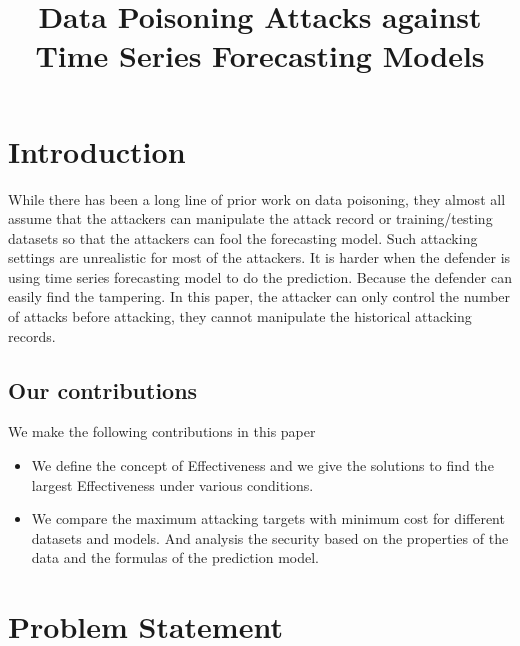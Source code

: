 \documentclass[journal]{IEEEtran}
\begin{document}
\title{Data Poisoning Attacks against Time Series Forecasting Models}

\author{
}

\maketitle

\begin{abstract}

\end{abstract}

\begin{IEEEkeywords}

\end{IEEEkeywords}

\section{Introduction}\label{sec:in}

While there has been a long line of prior work on data poisoning, they almost all assume that the attackers can manipulate the attack record or training/testing datasets so that the attackers can fool the forecasting model. Such attacking settings are unrealistic for most of the attackers. It is harder when the defender is using time series forecasting model to do the prediction. Because the defender can easily find the tampering. In this paper, the attacker can only control the number of attacks before attacking, they cannot manipulate the historical attacking records.

\subsection{Our contributions}

{\color{purple}
We make the following contributions in this paper
\begin{itemize}
    \item We define the concept of Effectiveness and we give the solutions to find the largest Effectiveness under various conditions.
    \item We compare the maximum attacking targets with minimum cost for different datasets and models. And analysis the security based on the properties of the data and the formulas of the prediction model.
\end{itemize}
}

\section{Problem Statement}\label{sec:ps}
\end{document}
